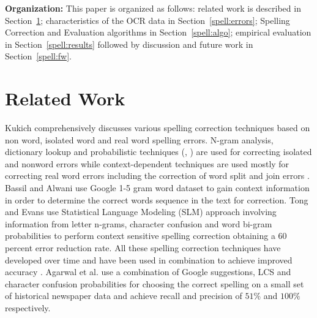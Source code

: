 \documentclass[preprint,11pt]{elsarticle}
\begin{document}
\noindent \textbf{Organization: } This paper is organized as follows: related work is described in Section~\ref{spell:rw}; characteristics of the OCR data in Section~\ref{spell:errors}; Spelling Correction and Evaluation algorithms in Section~\ref{spell:algo}; empirical evaluation in Section~\ref{spell:results} followed by discussion and future work in Section~\ref{spell:fw}. 

\section{Related Work}
\label{spell:rw}

Kukich\cite{kukich1992techniques} comprehensively discusses various spelling correction techniques based on non word, isolated word and real word spelling errors. N-gram analysis, dictionary lookup and probabilistic techniques (\cite{strohmaier2003lexical}, \cite{ringlstetter2007text}) are used for correcting isolated and nonword errors while context-dependent techniques are used mostly for correcting real word errors including the correction of word split and join errors \cite{elmi1998spelling}.
Bassil and Alwani\cite{bassil2012ocr} use Google 1-5 gram word dataset to gain context information in order to determine the correct words sequence in the text for correction.
Tong and Evans\cite{tong1996statistical} use Statistical Language Modeling (SLM) approach involving information from letter n-grams, character confusion and word bi-gram probabilities to perform context sensitive spelling correction obtaining a 60 percent error reduction rate. All these spelling correction techniques have developed over time and have been used in combination to achieve improved accuracy \cite{brill2000improved}. Agarwal et al.\cite{agarwal2013utilizing} use a combination of Google suggestions, LCS and character confusion probabilities for choosing the correct spelling on a small set of historical newspaper data and achieve recall and precision of $51\%$ and $100\%$ respectively.
\end{document}
